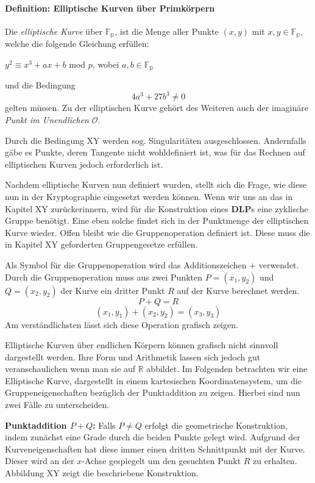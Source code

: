 \paragraph{Definition: Elliptische Kurven über Primkörpern}
Die \textit{elliptische Kurve} über $\mathbb{F_p}$, ist die Menge aller Punkte $(x,y)$ mit $x,y \in \mathbb{F_p}$, welche die folgende Gleichung erfüllen: 
\begin{center}
$y^2 \equiv x^3 + ax + b$ mod $p$, wobei $a,b \in \mathbb{F_p}$
\end{center} 
und die Bedingung  $$4a^3 + 27b^3 \neq 0$$ gelten müssen. Zu der elliptischen Kurve gehört des Weiteren auch der imaginäre \textit{Punkt im Unendlichen} $\mathcal{O}$.

Durch die Bedingung XY werden sog. Singularitäten ausgeschlossen. Andernfalls gäbe es Punkte, deren Tangente nicht wohldefiniert ist, was für das Rechnen auf elliptischen Kurven jedoch erforderlich ist.

Nachdem elliptische Kurven nun definiert wurden, stellt sich die Frage, wie diese nun in der Kryptographie eingesetzt werden können. Wenn wir uns an das in Kapitel XY zurückerinnern, wird für die Konstruktion eines \textbf{DLP}s eine zyklische Gruppe benötigt. Eine eben solche findet sich in der Punktmenge der elliptischen Kurve wieder. Offen bleibt wie die Gruppenoperation definiert ist. Diese muss die in Kapitel XY geforderten Gruppengesetze erfüllen.

Als Symbol für die Gruppenoperation wird das Additionszeichen $+$ verwendet. Durch die Gruppenoperation muss aus zwei Punkten $P = (x_1, y_2)$ und $Q= (x_2, y_2)$ der Kurve ein dritter Punkt $R$ auf der Kurve berechnet werden. 
$$P + Q = R$$ $$(x_1, y_1) +  (x_2, y_2) = (x_3, y_3)$$
Am verständlichsten lässt sich diese Operation grafisch zeigen.

Elliptische Kurven über endlichen Körpern können grafisch nicht sinnvoll dargestellt werden. Ihre Form und Arithmetik lassen sich jedoch gut veranschaulichen wenn man sie auf $\mathbb{R}$ abbildet. Im Folgenden betrachten wir eine Elliptische Kurve, dargestellt in einem kartesischen Koordinatensystem, um die Gruppeneigenschaften bezüglich der Punktaddition zu zeigen. Hierbei sind nun zwei Fälle zu unterscheiden. 

\textbf{Punktaddition $P + Q$:}
Falls $P \neq Q$ erfolgt die geometrische Konstruktion, indem zunächst eine Grade durch die beiden Punkte gelegt wird. Aufgrund der Kurveneigenschaften hat diese immer einen dritten Schnittpunkt mit der Kurve. Dieser wird an der $x$-Achse gespiegelt um den gesuchten Punkt $R$ zu erhalten. Abbildung XY zeigt die beschriebene Konstruktion.

